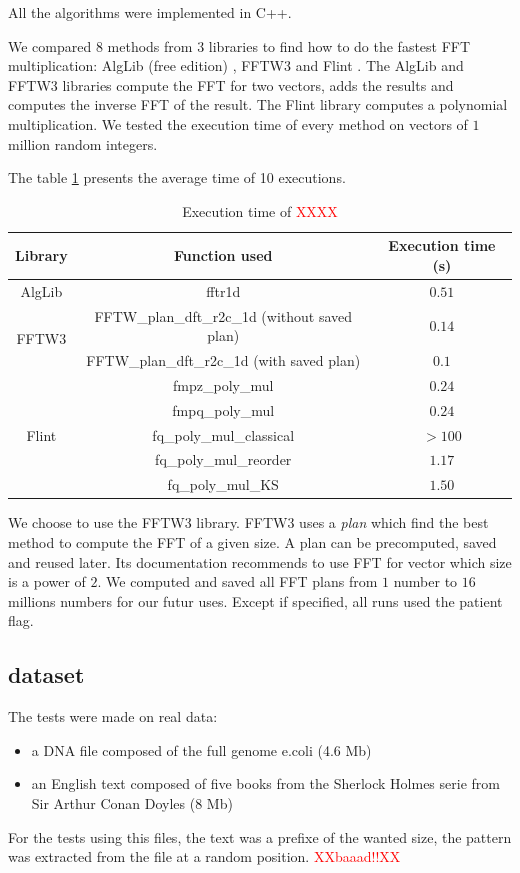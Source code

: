 \documentclass[preprint,12pt]{elsarticle}
\begin{document}
All the algorithms were implemented in C++.

We compared $8$ methods from $3$ libraries to find how to do the fastest FFT multiplication:
AlgLib (free edition) \cite{alglib}, FFTW3 \cite{FFTW05} and Flint \cite{Hart2010}.
The AlgLib and FFTW3 libraries compute the FFT for two vectors,
adds the results and computes the inverse FFT of the result.
The Flint library computes a polynomial multiplication.
We tested the execution time of every method on vectors of $1$ million random integers.

The table \ref{tempsFFT} presents the average time of 10 executions.


\begin{table}[h]
\label{tempsFFT}
\begin{tabular}{|c|c|c|}
\hline
Library 				& Function used 							& Execution time (s) \\ \hline
AlgLib 					& fftr1d 									& $0.51$ \\ \hline
\multirow{2}{*}{FFTW3} 	& FFTW\_plan\_dft\_r2c\_1d (without saved plan) & $0.14$ \\
						& FFTW\_plan\_dft\_r2c\_1d (with saved plan) 	& $0.1$ \\ \hline
\multirow{5}{*}{Flint} 	& fmpz\_poly\_mul 							& $0.24$ \\
						& fmpq\_poly\_mul 							& $0.24$ \\
						& fq\_poly\_mul\_classical 					& $> 100$ \\
						& fq\_poly\_mul\_reorder 						& $1.17$ \\
						& fq\_poly\_mul\_KS 							& $1.50$ \\ \hline
\end{tabular}
\caption{Execution time of \textcolor{red}{XXXX}}
\end{table}

We choose to use the FFTW3 library.
FFTW3 uses a \textit{plan} which find the best method to compute the FFT of a given size.
A plan can be precomputed, saved and reused later.
Its documentation recommends to use FFT for vector which size is a power of $2$.
We computed and saved all FFT plans from $1$ number to $16$ millions numbers for our futur uses.
Except if specified, all runs used the patient flag.


\subsection{dataset}

The tests were made on real data:
\begin{itemize}
\setlength\itemsep{0.1em}
\item a DNA file composed of the full genome e.coli (4.6 Mb)
\item an English text composed of five books from the Sherlock Holmes serie from Sir Arthur Conan Doyles (8 Mb)
\end{itemize}
For the tests using this files, the text was a prefixe of the wanted size, 
the pattern was extracted from the file at a random position. \textcolor{red}{XXbaaad!!XX}
\end{document}
